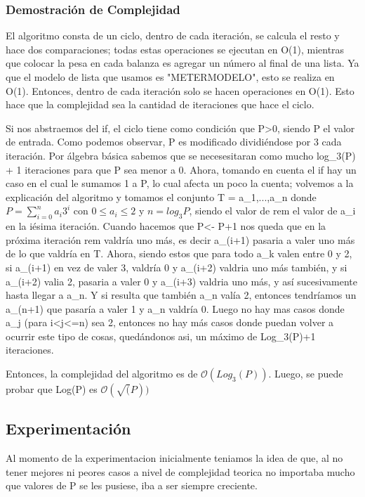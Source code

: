 \documentclass[spanish,12pt]{article}
\begin{document}
\subsubsection{Demostración de Complejidad}

El algoritmo consta de un ciclo, dentro de cada iteración, se calcula el resto y hace dos comparaciones; todas estas operaciones se ejecutan en O(1), mientras que colocar la pesa en cada balanza
es agregar un número al final de una lista. Ya que el modelo de lista que usamos es "METERMODELO", esto se realiza en O(1).
Entonces, dentro de cada iteración solo se hacen operaciones en O(1). Esto hace que la complejidad sea la cantidad de iteraciones que hace el ciclo.

Si nos abstraemos del if, el ciclo tiene como condición que P>0, siendo P el valor de entrada. Como podemos observar, P es modificado dividiéndose por 3 cada iteración. Por álgebra básica sabemos que se necesesitaran como mucho log_3(P) + 1 iteraciones para que P sea menor a 0.
Ahora, tomando en cuenta el if hay un caso en el cual le sumamos 1 a P, lo cual afecta un poco la cuenta; volvemos a la explicación del algoritmo y tomamos el conjunto T = {a_1,...,a_n}
donde  $P = \sum_{i=0}^{n} a_i3^i$  con $0 \leq a_i \leq 2$ y $n = log_{3}{P}$, siendo el valor de rem el valor de a_i en la iésima iteración.
Cuando hacemos que P<- P+1 nos queda que en la próxima iteración rem valdría uno más, es decir a_(i+1) pasaria a valer uno más de lo que valdría en T. Ahora,  siendo estos que para todo a_k
valen entre 0 y 2, si a_(i+1) en vez de valer 3, valdría 0 y a_(i+2) valdria uno más también, y si  a_(i+2) valia 2, pasaria a valer 0 y  a_(i+3) valdria uno más, y así sucesivamente hasta llegar a a_n.
Y si resulta que también a_n valía 2, entonces tendríamos un a_(n+1) que pasaría a valer 1 y a_n valdría 0.
Luego no hay mas casos donde a_j (para i<j<=n) sea 2, entonces no hay más casos donde puedan volver a ocurrir este tipo de cosas, quedándonos asi, un máximo de Log_3(P)+1 iteraciones.

Entonces, la complejidad del algoritmo es de $\mathcal{O}(Log_{3}(P))$.
Luego, se puede probar que Log(P) es $\mathcal{O}(\sqrt(P))$


\subsection{Experimentación}
 Al momento de la experimentacion inicialmente teniamos la idea de que, al no tener mejores ni peores casos a nivel de complejidad teorica no importaba mucho que valores de P se les pusiese, iba a ser siempre creciente.
\end{document}
